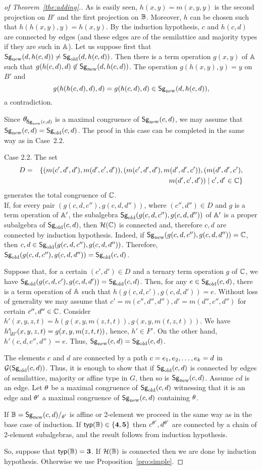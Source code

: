 \documentclass[11pt]{article}
\begin{document}
\begin{proof}[of Theorem~\ref{the:adding}.]
As is easily seen, $h(x,y)=m(x,y,y)$ is the second projection on
$B'$ and the first projection
on ${\mathbb B}$. Moreover, $h$ can be chosen such that
$h(h(x,y),y)=h(x,y)$. By the induction hypothesis, $c$ and $h(c,d)$
are connected 
by edges (and these edges are of the semilattice and majority types if they are 
such in ${\mathbb A}$). Let us suppose first that
${\sf Sg}_{\mathrm{new}}(d,h(c,d))\ne{\sf Sg}_{\mathrm{old}}(d,h(c,d))$. Then there is a term
operation $g(x,y)$ of ${\mathbb A}$ such that
$g(h(c,d),d)\not\in{\sf Sg}_{\mathrm{new}}(d,h(c,d))$. The 
operation $g(h(x,y),y)=y$ on $B'$ and
$$
g(h(h(c,d),d),d)=g(h(c,d),d)\in{\sf Sg}_{\mathrm{new}}(d,h(c,d)),
$$
a contradiction.

Since $\th\red{\Sgn{c,d}}$ is a maximal congruence of
${\sf Sg}_{\mathrm{new}}(c,d)$, we may assume that
${\sf Sg}_{\mathrm{new}}(c,d)={\sf Sg}_{\mathrm{old}}(c,d)$. The proof in this case can be
completed in the same way as in Case~2.2.
\medskip

\noindent
{\sc Case 2.2.} The set 
\begin{eqnarray*}
D&=&\{(m(c',d',d'),m(d',c',d')),
(m(c',d',d'),m(d',d',c')),(m(d',d',c'),\\
& & \ \ \ m(d',c',d'))\mid c',d'\in{\mathbb C}\}
\end{eqnarray*}
generates the total congruence of ${\mathbb C}$.\\[2mm]
If, for every pair $(g(c,d,c''),g(c,d,d''))$, where $(c'',d'')\in D$ and $g$ is a term 
operation of ${\mathbb A}'$,
the subalgebra ${\sf Sg}_{\mathrm{old}}(g(c,d,c''),g(c,d,d''))$ of ${\mathbb A}'$ is a
proper subalgebra of ${\sf Sg}_{\mathrm{old}}(c,d)$, then ${\mathcal H}({\mathbb C})$ is connected
and, therefore $c,d$ are connected  by induction hypothesis. Indeed, if
${\sf Sg}_{\mathrm{new}}(g(c,d,c''),g(c,d,d''))={\mathbb C}$, then
$c,d\in{\sf Sg}_{\mathrm{old}}(g(c,d,c''),g(c,d,d''))$. Therefore,
${\sf Sg}_{\mathrm{old}}(g(c,d,c''),g(c,d,d''))={\sf Sg}_{\mathrm{old}}(c,d)$.

Suppose that, for a certain $(c',d')\in D$ and a ternary term
operation $g$ of ${\mathbb C}$, we have
${\sf Sg}_{\mathrm{old}}(g(c,d,c'),g(c,d,d'))={\sf Sg}_{\mathrm{old}}(c,d)$. Then, for any
$e\in{\sf Sg}_{\mathrm{old}}(c,d)$, there is a term operation of ${\mathbb A}$ such that
$h(g(c,d,c'),g(c,d,d'))=e$. Without loss of generality we may assume
that $c'=m(c'',d'',d''), d'=m(d'',c'',d'')$ for certain
$c'',d''\in{\mathbb C}$. Consider
$h'(x,y,z,t)=h(g(x,y,m(z,t,t)),g(x,y,m(t,z,t)))$. We have
$h'\red{B'}(x,y,z,t)=g(x,y,m(z,t,t))$, hence, $h'\in F'$. On the
other hand, $h'(c,d,c'',d'')=e$. Thus, ${\sf Sg}_{\mathrm{new}}(c,d)={\sf Sg}_{\mathrm{old}}(c,d)$.

The elements $c$ and $d$ are connected by a path $c=e_1,e_2,\ldots, e_k=d$
in ${\mathcal G}({\sf Sg}_{\mathrm{old}}(c,d))$. Thus, it is enough to show that if
${\sf Sg}_{\mathrm{old}}(c,d)$ is 
connected by edges of semilattice, majority or affine type in $G$,
then so is ${\sf Sg}_{\mathrm{new}}(c,d)$. Assume $cd$ is an edge. Let $\theta$ be a maximal congruence of
${\sf Sg}_{\mathrm{old}}(c,d)$ witnessing that it is an edge and $\theta'$ a maximal
congruence of ${\sf Sg}_{\mathrm{new}}(c,d)$ containing $\theta$. 

If $\zB=\Sgn{c,d}\fac{\th'}$ is affine or 2-element we proceed in
the same way as in the base case of induction. If
${\sf typ}({\mathbb B})\in\{{\bf4},{\bf5}\}$ then
$c^{\theta'},d^{\theta'}$ are connected by a chain of 2-element
subalgebras, and the result follows from induction hypothesis.

So, suppose that ${\sf typ}({\mathbb B})={\bf3}$. If ${\mathcal H}({\mathbb B})$ is connected then
we are done by induction hypothesis. Otherwise we use
Proposition~\ref{pro:simple}. 
\end{proof}
\end{document}
